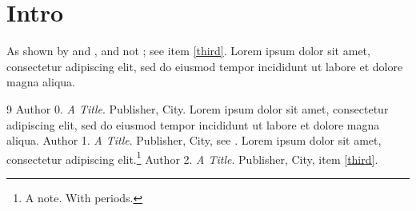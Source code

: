 \documentclass{report}
\begin{document}
\section{Intro}
As shown by \cite{knuth} and \cite{lamport,knuth}, and not \cite{nobody}; see item \ref{third}. Lorem ipsum dolor sit amet, consectetur adipiscing elit, sed do eiusmod tempor incididunt ut labore et dolore magna aliqua.

\begin{thebibliography}{9}
 Author 0. \emph{A Title}. Publisher, City. Lorem ipsum dolor sit amet, consectetur adipiscing elit, sed do eiusmod tempor incididunt ut labore et dolore magna aliqua.
 Author 1. \emph{A Title}. Publisher, City, see \cite{knuth}. Lorem ipsum dolor sit amet, consectetur adipiscing elit.\footnote{A note. With periods.}
 Author 2.\label{third} \emph{A Title}. Publisher, City, item \ref{third}.
\end{thebibliography}
\end{document}
